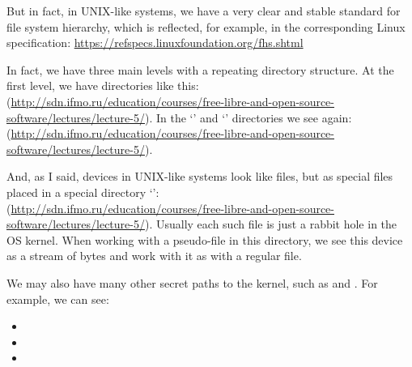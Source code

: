 But in fact, in UNIX-like systems, we have a very clear and stable standard
for file system hierarchy, which is reflected, for example,
in the corresponding Linux specification:
\href{https://refspecs.linuxfoundation.org/fhs.shtml}{https://refspecs.linuxfoundation.org/fhs.shtml}

In fact, we have three main levels with a repeating directory structure.
At the first level, we have directories like this:\\
(\url{http://sdn.ifmo.ru/education/courses/free-libre-and-open-source-software/lectures/lecture-5/}).
In the `' and `' directories we see again:\\
(\url{http://sdn.ifmo.ru/education/courses/free-libre-and-open-source-software/lectures/lecture-5/}).

And, as I said, devices in UNIX-like systems look like files,
but as special files placed in a special directory `':\\
(\url{http://sdn.ifmo.ru/education/courses/free-libre-and-open-source-software/lectures/lecture-5/}).
Usually each such file is just a rabbit hole in the OS kernel.
When working with a pseudo-file in this directory, we see this device
as a stream of bytes and work with it as with a regular file.

We may also have many other secret paths to the kernel, such as 
and . For example, we can see:
\begin{itemize}
\item {}
\item {}
\item {}
\end{itemize}
